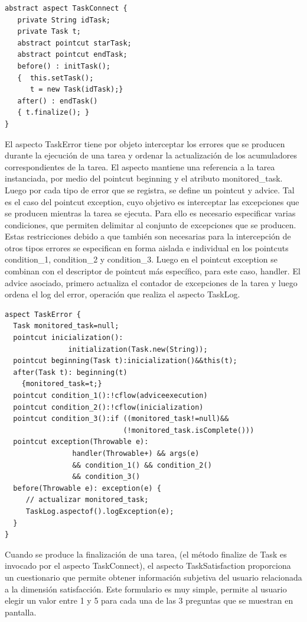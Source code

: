 \begin{verbatim}
abstract aspect TaskConnect {
   private String idTask;
   private Task t;
   abstract pointcut starTask; 
   abstract pointcut endTask;
   before() : initTask();
   {  this.setTask();
      t = new Task(idTask);}
   after() : endTask()
   { t.finalize(); }
}
\end{verbatim}
El aspecto TaskError tiene por objeto interceptar los errores que se producen durante la ejecución de una tarea y ordenar la actualización de los acumuladores correspondientes de la tarea. El aspecto mantiene una referencia a la tarea instanciada, por medio del pointcut beginning y el atributo monitored\_task. Luego por cada tipo de error que se registra, se define un pointcut y advice. Tal es el caso del pointcut exception, cuyo objetivo es interceptar las excepciones que se producen mientras la tarea se ejecuta. Para ello es necesario especificar varias condiciones, que permiten delimitar al conjunto de excepciones que se producen. Estas restricciones debido a que también son necesarias para la intercepción de otros tipos errores se especifican en forma aislada e individual en los pointcuts condition\_1, condition\_2 y condition\_3. Luego en el pointcut exception se combinan con el descriptor de pointcut más específico, para este caso, handler. El advice asociado, primero actualiza el contador de excepciones de la tarea y luego ordena el log del error, operación que realiza el aspecto TaskLog. 
\begin{verbatim}
aspect TaskError {
  Task monitored_task=null;
  pointcut inicialization():    
               initialization(Task.new(String));
  pointcut beginning(Task t):inicialization()&&this(t);
  after(Task t): beginning(t)
    {monitored_task=t;} 
  pointcut condition_1():!cflow(adviceexecution)
  pointcut condition_2():!cflow(inicialization) 
  pointcut condition_3():if ((monitored_task!=null)&&
                            (!monitored_task.isComplete()))
  pointcut exception(Throwable e): 
                handler(Throwable+) && args(e)
                && condition_1() && condition_2()
                && condition_3()
  before(Throwable e): exception(e) {
     // actualizar monitored_task;
     TaskLog.aspectof().logException(e);
  }
}
\end{verbatim}
Cuando se produce la finalización de una tarea, (el método finalize de Task es invocado por el aspecto TaskConnect), el aspecto TaskSatisfaction proporciona un cuestionario que permite obtener información subjetiva del usuario relacionada a la dimensión satisfacción. Este formulario es muy simple, permite al usuario elegir un valor entre 1 y 5 para cada una de las 3 preguntas que se muestran en pantalla. 
